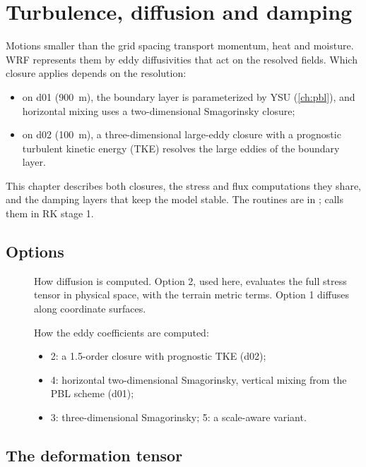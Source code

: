 \chapter{Turbulence, diffusion and damping}\label{ch:turb}

Motions smaller than the grid spacing transport momentum, heat and moisture. WRF represents them by eddy
diffusivities that act on the resolved fields. Which closure applies depends on the resolution:
\begin{itemize}
  \item on d01 (900~m), the boundary layer is parameterized by YSU (\cref{ch:pbl}), and horizontal mixing uses a
    two-dimensional Smagorinsky closure;
  \item on d02 (100~m), a three-dimensional large-eddy closure with a prognostic turbulent kinetic energy (TKE)
    resolves the large eddies of the boundary layer.
\end{itemize}
This chapter describes both closures, the stress and flux computations they share, and the damping layers that keep
the model stable. The routines are in ;  calls them in
RK stage 1.

\section{Options}

\begin{description}
  \item[] How diffusion is computed. Option 2, used here, evaluates the full stress tensor in physical
    space, with the terrain metric terms. Option 1 diffuses along coordinate surfaces.
  \item[] How the eddy coefficients are computed:
    \begin{itemize}
      \item 2: a 1.5-order closure with prognostic TKE (d02);
      \item 4: horizontal two-dimensional Smagorinsky, vertical mixing from the PBL scheme (d01);
      \item 3: three-dimensional Smagorinsky; 5: a scale-aware variant.
    \end{itemize}
\end{description}

\section{The deformation tensor}

